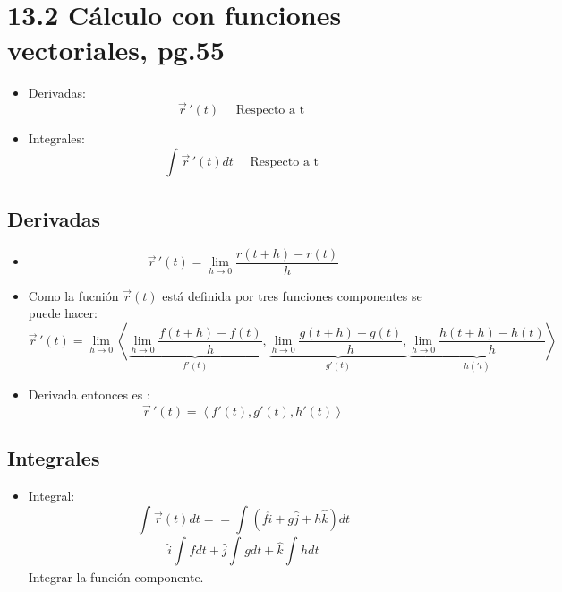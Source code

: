 \section{13.2 Cálculo con funciones vectoriales, pg.55}
\begin{itemize}
    \item Derivadas:
        \[
          \vec{r}\,'(t) \quad \text{  Respecto a t  }
        \]
    
    \item Integrales:
        \[
          \int_{}^{}\vec{r}\,'(t)dt \quad \text{  Respecto a t  }
        \]
\end{itemize}


\subsection{Derivadas}
\begin{itemize}
    \item \[
      \vec{r}\,'(t) = \lim_{h \to 0} \frac{r(t+h)-r(t)}{h} 
    \]
    
    \item Como la fucnión $\vec{r}(t)$ está definida por tres funciones componentes se puede hacer: 
        \[
          \vec{r}\,'(t) = \lim_{h \to 0} \left\langle 
          \underbrace{\lim_{h \to 0} \frac{f(t+h)-f(t)}{h}}_{f'(t)}, 
          \underbrace{\lim_{h \to 0} \frac{g(t+h)-g(t)}{h}, }_{g'(t)}
          \underbrace{\lim_{h \to 0} \frac{h(t+h)-h(t)}{h}  }_{h('t)}
          \right\rangle 
        \]
    
    \item Derivada entonces es : 
        \[
          \vec{r}\,'(t) = \left\langle f'(t),g'(t),h'(t) \right\rangle 
        \]
\end{itemize}


\subsection{Integrales}
\begin{itemize}
    \item Integral:
        \[
          \int_{}^{}\vec{r}(t)dt = = \int_{}^{}(f \hat{i} + g \hat{j} + h \hat{k} )dt
        \]
        \[
          \hat{i} \int_{}^{}fdt + \hat{j} \int_{}^{}gdt + \hat{k} \int_{}^{}hdt 
        \]
        Integrar la función componente.
\end{itemize}


